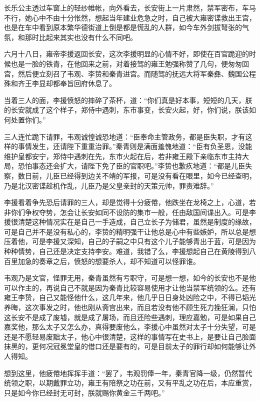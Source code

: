 长乐公主透过车窗上的轻纱帷帐，向外看去，长安街上一片肃然，禁军密布，车马不行，她心中不由十分怅然，想起当年建业危急之时，自己被大雍密谍救出王宫，也是在车中看到原本繁华德街道上倒是都是慌乱的人群，如今车外剑拔弩张的气氛，和那时比起来其实也没有什么不同吧。

六月十八日，雍帝李援返回长安，这次李援明显的心情不好，即使在百官跪迎的时候也是一脸的铁青，在他回来之前，对着接驾的雍王勉强称赞了几句，便匆匆回宫，然后便立刻召了韦观、李贽和秦青进宫。而随驾的抚远大将军秦彝、魏国公程殊和齐王李显却都奉旨回府休息了。

当着三人的面，李援愤怒的摔碎了茶杯，道：“你们真是好本事，短短的几天，朕的长安就成了这个样子，郑侍中遇刺，东市事变，长安火起，好，你们说，朕该如何处置你们。”

三人连忙跪下请罪，韦观诚惶诚恐地道：“臣奉命主管政务，都是臣失职，才有这样的事情发生，还请陛下重重治罪。”秦青则是满面羞愧地道：“臣有负圣恩，没能维护皇都安宁，郑侍中遇刺在先，东市火起在后，若非雍王殿下亲临东市主持大局，恐怕事态还会扩大，请陛下免了臣的官职吧。”李贽也歉疚地道：“都是儿臣失察，数日前，儿臣已经得到边关不靖的军报，可是没有看在眼里，如今已经查明，乃是北汉密谍趁机作乱，儿臣乃是父皇亲封的天策元帅，罪责难辞。”

李援看着争先恐后请罪的三人，却是觉得十分疲倦，他跌坐在龙椅之上，心道，若非你们争权夺势，怎会让长安如同不设防的集市一般，任由敌国间谍出入。可是李援很清楚这种情况实在是自己一手造成，自己立长子为储君，虽然是制度的缘故，可是自己并不是没有私心的，李贽的精明强干让他总是心中有些嫉妒，所以总是想压着他，可是李援又深知，自己的子嗣之中只有这个儿子能够青出于蓝，可是因为种种情势，自己还是决定支持李安。难道，我错了么，李援想起自己在黄陵得到八百里加急的奏章之后，愤怒的想要杀人，却不知道可以怪罪谁。

韦观乃是文官，怪罪无用，秦青虽然有亏职守，可是想一想，如今的长安也不是他可以作主的，再说自己不就是因为秦青比较容易使用才让他当禁军统领的么。还有雍王李贽，自己又能怪他什么，这几年来，他几乎日日身处凶险之中，不得已韬光养晦，这次事发之时，他也刚从斋宫出来，而且若没有他不顾生死力挽狂澜，只怕这长安不是成了废墟，就是成了屠场，而且还险些遇刺，理应嘉勉，可是如果自己嘉奖他，那么太子又怎么办，真得要废他么，李援心中虽然对太子十分失望，可是还是不愿轻易废黜太子，他心中很清楚，这样的事情写在史书上，是要让自己脸面抹黑的，更何况冠冕堂皇的借口还是要有的，可是目前太子的罪行却如何能够让外人得知。

想到这里，他疲倦地挥挥手道：“罢了，韦观罚俸一年，秦青官降一级，仍然暂代统领之职，以期戴罪立功，雍王有陪祭之功在前，又有平乱之功在后，本应重赏，只是如今你已经封无可封，朕就赐你黄金三千两吧。”

